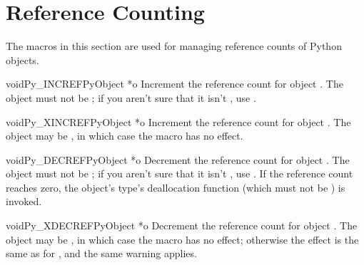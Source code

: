 \chapter{Reference Counting \label{countingRefs}}


The macros in this section are used for managing reference counts
of Python objects.


\begin{cfuncdesc}{void}{Py_INCREF}{PyObject *o}
  Increment the reference count for object .  The object must
  not be \NULL; if you aren't sure that it isn't \NULL, use
  .
\end{cfuncdesc}

\begin{cfuncdesc}{void}{Py_XINCREF}{PyObject *o}
  Increment the reference count for object .  The object may be
  \NULL, in which case the macro has no effect.
\end{cfuncdesc}

\begin{cfuncdesc}{void}{Py_DECREF}{PyObject *o}
  Decrement the reference count for object .  The object must
  not be \NULL; if you aren't sure that it isn't \NULL, use
  .  If the reference count reaches zero, the
  object's type's deallocation function (which must not be \NULL) is
  invoked.

\end{cfuncdesc}

\begin{cfuncdesc}{void}{Py_XDECREF}{PyObject *o}
  Decrement the reference count for object .  The object may be
  \NULL, in which case the macro has no effect; otherwise the effect
  is the same as for , and the same warning
  applies.
\end{cfuncdesc}

